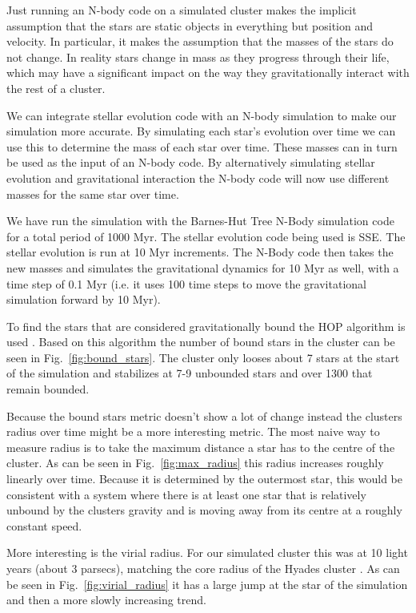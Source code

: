 \documentclass{aa}
\begin{document}
Just running an N-body code on a simulated cluster makes the implicit assumption that the stars are static objects in everything but position and velocity. In particular, it makes the assumption that the masses of the stars do not change. In reality stars change in mass as they progress through their life, which may have a significant impact on the way they gravitationally interact with the rest of a cluster.

We can integrate stellar evolution code with an N-body simulation to make our simulation more accurate. By simulating each star's evolution over time we can use this to determine the mass of each star over time. These masses can in turn be used as the input of an N-body code. By alternatively simulating stellar evolution and gravitational interaction the N-body code will now use different masses for the same star over time.

We have run the simulation with the Barnes-Hut Tree N-Body simulation code \citep{1986Natur.324..446B} for a total period of 1000 Myr. The stellar evolution code being used is SSE. The stellar evolution is run at 10 Myr increments. The N-Body code then takes the new masses and simulates the gravitational dynamics for 10 Myr as well, with a time step of 0.1 Myr (i.e. it uses 100 time steps to move the gravitational simulation forward by 10 Myr).

To find the stars that are considered gravitationally bound the HOP algorithm is used \citep{1998ApJ...498..137E}. Based on this algorithm the number of bound stars in the cluster can be seen in Fig.~\ref{fig:bound_stars}. The cluster only looses about 7 stars at the start of the simulation and stabilizes at 7-9 unbounded stars and over 1300 that remain bounded. 

Because the bound stars metric doesn't show a lot of change instead the clusters radius over time might be a more interesting metric. The most naive way to measure radius is to take the maximum distance a star has to the centre of the cluster. As can be seen in Fig.~\ref{fig:max_radius} this radius increases roughly linearly over time. Because it is determined by the outermost star, this would be consistent with a system where there is at least one star that is relatively unbound by the clusters gravity and is moving away from its centre at a roughly constant speed. 

More interesting is the virial radius. For our simulated cluster this was at 10 light years (about 3 parsecs), matching the core radius of the Hyades cluster \citep{2009AIPC.1094..497B}. As can be seen in Fig.~\ref{fig:virial_radius} it has a large jump at the star of the simulation and then a more slowly increasing trend.
\end{document}

